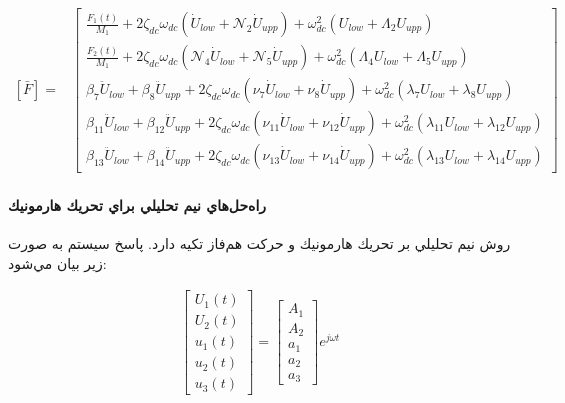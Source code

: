 \begin{equation}\label{Eq.force_vector_dimensionless}
\begin{aligned}
[\bar{F}] = & \begin{bmatrix}
\frac{F_1(t)}{M_1} + 2 \zeta_{dc} \omega_{dc} (\dot{U}_{low} + \mathcal{N}_2 \dot{U}_{upp}) + \omega_{dc}^2 (U_{low} + \Lambda_2 U_{upp})\\
\frac{F_2(t)}{M_1} + 2 \zeta_{dc} \omega_{dc} (\mathcal{N}_4 \dot{U}_{low} + \mathcal{N}_5 \dot{U}_{upp}) + \omega_{dc}^2 (\Lambda_4 U_{low} + \Lambda_5 U_{upp}) \\
\beta_7 \ddot{U}_{low} +  \beta_8 \ddot{U}_{upp} +  2 \zeta_{dc} \omega_{dc} (\nu_7 \dot{U}_{low} + \nu_8 \dot{U}_{upp}) +\omega_{dc}^2 (\lambda_7 U_{low} + \lambda_8 U_{upp})\\
\beta_{11} \ddot{U}_{low} +  \beta_{12} \ddot{U}_{upp} +  2 \zeta_{dc} \omega_{dc} (\nu_{11} \dot{U}_{low} + \nu_{12} \dot{U}_{upp}) +\omega_{dc}^2 (\lambda_{11} U_{low} + \lambda_{12} U_{upp})\\
\beta_{13} \ddot{U}_{low} +  \beta_{14} \ddot{U}_{upp} +  2 \zeta_{dc} \omega_{dc} (\nu_{13} \dot{U}_{low} + \nu_{14} \dot{U}_{upp}) +\omega_{dc}^2 (\lambda_{13} U_{low} + \lambda_{14} U_{upp})
\end{bmatrix}
\end{aligned}
\end{equation}

\paragraph{راه‌حل‌هاي نيم تحليلي براي تحريك هارمونيك}

روش نيم تحليلي بر تحريك هارمونيك و حركت هم‌فاز تكيه دارد. پاسخ سيستم به صورت زير بيان مي‌شود:

\begin{align}\label{Eq.harmonic.solution.2dof3dof}
    \begin{bmatrix}
        U_1(t) \\
        U_2(t) \\
        u_1(t) \\
        u_2(t) \\
        u_3(t)
    \end{bmatrix} =
    \begin{bmatrix}
        A_1 \\
        A_2 \\
        a_1 \\
        a_2 \\
        a_3
    \end{bmatrix} e^{j \omega t}
\end{align}

